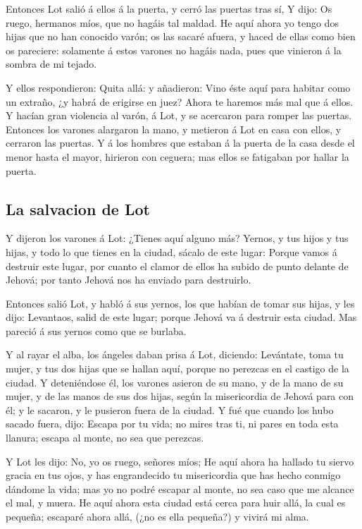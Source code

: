  Entonces Lot salió á ellos á la puerta, y cerró las puertas
tras sí,  Y dijo: Os ruego, hermanos míos, que no hagáis tal
maldad.  He aquí ahora yo tengo dos hijas que no han
conocido varón; os las sacaré afuera, y haced de ellas como bien os
pareciere: solamente á estos varones no hagáis nada, pues que vinieron á
la sombra de mi tejado.

 Y ellos respondieron: Quita allá: y añadieron: Vino éste
aquí para habitar como un extraño, ¿y habrá de erigirse en juez? Ahora
te haremos más mal que á ellos. Y hacían gran violencia al varón, á Lot,
y se acercaron para romper las puertas.  Entonces los
varones alargaron la mano, y metieron á Lot en casa con ellos, y
cerraron las puertas.  Y á los hombres que estaban á la
puerta de la casa desde el menor hasta el mayor, hirieron con ceguera;
mas ellos se fatigaban por hallar la puerta.

\hypertarget{la-salvacion-de-lot}{%
\subsection{La salvacion de Lot}\label{la-salvacion-de-lot}}

 Y dijeron los varones á Lot: ¿Tienes aquí alguno más?
Yernos, y tus hijos y tus hijas, y todo lo que tienes en la ciudad,
sácalo de este lugar:  Porque vamos á destruir este lugar,
por cuanto el clamor de ellos ha subido de punto delante de Jehová; por
tanto Jehová nos ha enviado para destruirlo.

 Entonces salió Lot, y habló á sus yernos, los que habían
de tomar sus hijas, y les dijo: Levantaos, salid de este lugar; porque
Jehová va á destruir esta ciudad. Mas pareció á sus yernos como que se
burlaba.

 Y al rayar el alba, los ángeles daban prisa á Lot,
diciendo: Levántate, toma tu mujer, y tus dos hijas que se hallan aquí,
porque no perezcas en el castigo de la ciudad.  Y
deteniéndose él, los varones asieron de su mano, y de la mano de su
mujer, y de las manos de sus dos hijas, según la misericordia de Jehová
para con él; y le sacaron, y le pusieron fuera de la ciudad.
 Y fué que cuando los hubo sacado fuera, dijo: Escapa por
tu vida; no mires tras ti, ni pares en toda esta llanura; escapa al
monte, no sea que perezcas.

 Y Lot les dijo: No, yo os ruego, señores míos;
 He aquí ahora ha hallado tu siervo gracia en tus ojos, y
has engrandecido tu misericordia que has hecho conmigo dándome la vida;
mas yo no podré escapar al monte, no sea caso que me alcance el mal, y
muera.  He aquí ahora esta ciudad está cerca para huir
allá, la cual es pequeña; escaparé ahora allá, (¿no es ella pequeña?) y
vivirá mi alma.

